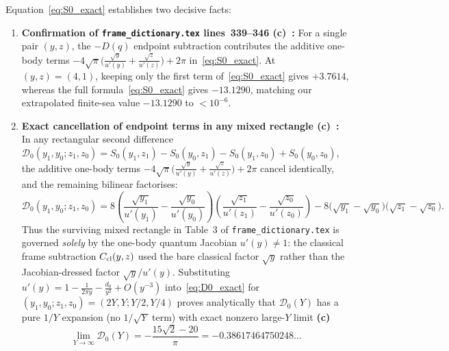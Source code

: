 \documentclass[11pt,a4paper]{article}
\newcommand{\Lc}{\textsf{\textbf{(c)}}\ }
\begin{document}
Equation~\eqref{eq:S0_exact} establishes two decisive facts:
\begin{enumerate}
\item \textbf{Confirmation of \texttt{frame\_\allowbreak dictionary.tex} lines~339--346 \Lc:}
For a single pair $(y,z)$, the $-D(q)$ endpoint subtraction contributes the additive
one-body terms $-4\sqrt\pi\big(\frac{\sqrt y}{u'(y)}+\frac{\sqrt z}{u'(z)}\big)+2\pi$
in~\eqref{eq:S0_exact}. At $(y,z)=(4,1)$, keeping only the first term of~\eqref{eq:S0_exact}
gives $+3.7614$, whereas the full formula~\eqref{eq:S0_exact} gives $-13.1290$,
matching our extrapolated finite-sea value $-13.1290$ to $<10^{-6}$.
\item \textbf{Exact cancellation of endpoint terms in any mixed rectangle \Lc:}
In any rectangular second difference
$\mathcal D_0(y_1,y_0;z_1,z_0)=S_0(y_1,z_1)-S_0(y_0,z_1)-S_0(y_1,z_0)+S_0(y_0,z_0)$,
the additive one-body terms $-4\sqrt\pi\big(\frac{\sqrt y}{u'(y)}+\frac{\sqrt z}{u'(z)}\big)+2\pi$
cancel identically, and the remaining bilinear factorises:
\begin{equation}\label{eq:D0_exact}
 \boxed{\mathcal D_0(y_1,y_0;z_1,z_0)
 =8\left(\frac{\sqrt{y_1}}{u'(y_1)}-\frac{\sqrt{y_0}}{u'(y_0)}\right)
   \left(\frac{\sqrt{z_1}}{u'(z_1)}-\frac{\sqrt{z_0}}{u'(z_0)}\right)
  -8\big(\sqrt{y_1}-\sqrt{y_0}\big)\big(\sqrt{z_1}-\sqrt{z_0}\big).}
\end{equation}
Thus the surviving mixed rectangle in Table~3 of \texttt{frame\_\allowbreak dictionary.tex}
is governed \emph{solely} by the one-body quantum Jacobian $u'(y)\ne 1$: the classical
frame subtraction $C_{\rm cl}(y,z)$ used the bare classical factor $\sqrt y$ rather than
the Jacobian-dressed factor $\sqrt y/u'(y)$. Substituting $u'(y)=1-\frac{1}{2\pi y}-\frac{d_0}{y^2}+O(y^{-3})$
into~\eqref{eq:D0_exact} for $(y_1,y_0;z_1,z_0)=(2Y,Y;Y/2,Y/4)$ proves analytically
that $\mathcal D_0(Y)$ has a pure $1/Y$ expansion (no $1/\sqrt Y$ term) with exact
nonzero large-$Y$ limit \Lc
\begin{equation}\label{eq:D0_inf}
 \lim_{Y\to\infty}\mathcal D_0(Y)=-\frac{15\sqrt2-20}{\pi}=-0.38617464750248\ldots
\end{equation}
\end{enumerate}
\end{document}
